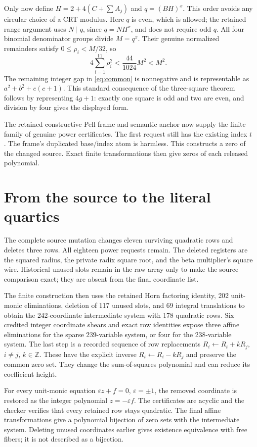 Only now define $H=2+4(C+\sum A_j)$ and $q=(BH)^x$. This order avoids
any circular choice of a CRT modulus. Here $q$ is even, which is allowed;
the retained range argument uses $N\mid q$, since $q=NH^x$, and does
not require odd $q$. All four binomial denominator groups divide $M=q^x$.
Their genuine normalized remainders satisfy $0\le\rho_i<M/32$, so
\[
 4\sum_{i=1}^{11}\rho_i^2<\frac{44}{1024}M^2<M^2.
\]
The remaining integer gap in \eqref{eq:common} is nonnegative and is
representable as $a^2+b^2+c(c+1)$. This standard consequence of the
three-square theorem follows by representing $4g+1$: exactly one square
is odd and two are even, and division by four gives the displayed form.

The retained constructive Pell frame and semantic anchor now supply the
finite family of genuine power certificates. The first request still has
the existing index $t$. The frame's duplicated base/index atom is harmless.
This constructs a zero of the changed source. Exact finite transformations
then give zeros of each released polynomial.

\section{From the source to the literal quartics}\label{sec:finite}

The complete source mutation changes eleven surviving quadratic rows and
deletes three rows. All eighteen power requests remain. The deleted
registers are the squared radius, the private radix square root, and the
beta multiplier's square wire. Historical unused slots remain in the raw
array only to make the source comparison exact; they are absent from the
final coordinate list.

The finite construction then uses the retained Horn factoring identity,
202 unit-monic eliminations, deletion of 117 unused slots, and 69 integral
translations to obtain the 242-coordinate intermediate system with
178 quadratic rows. Six credited integer coordinate shears and exact row
identities expose three affine eliminations for the sparse 239-variable
system, or four for the 238-variable system. The last step is a recorded
sequence of row replacements $R_i\leftarrow R_i+kR_j$, $i\ne j$,
$k\in\mathbb Z$. These have the explicit inverse
$R_i\leftarrow R_i-kR_j$ and preserve the common zero set. They change
the sum-of-squares polynomial and can reduce its coefficient height.

For every unit-monic equation $\varepsilon z+f=0$, $\varepsilon=\pm1$,
the removed coordinate is restored as the integer polynomial
$z=-\varepsilon f$. The certificates are acyclic and the checker verifies
that every retained row stays quadratic. The final affine transformations
give a polynomial bijection of zero sets with the intermediate system.
Deleting unused coordinates earlier gives existence equivalence with free
fibers; it is not described as a bijection.

